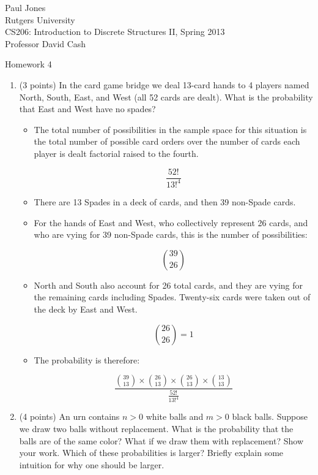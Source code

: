 \documentclass[11pt]{article}
\begin{document}
\noindent Paul Jones \\
Rutgers University\\
CS206: Introduction to Discrete Structures II, Spring 2013\\
Professor David Cash\\

\begin{center}
Homework 4
\end{center}

\begin{enumerate}

	\item (3 points) In the card game bridge we deal 13-card hands to 4 players
		  named North, South, East, and West (all 52 cards are dealt).  What is the
		  probability that East and West have no spades?
	
	\begin{itemize}
	
		\item The total number of possibilities in the sample space for this situation is
			  the total number of possible card orders over the number of cards each player
			  is dealt factorial raised to the fourth.
		
			  \[ \frac{52!}{13!^4} \]
		
		\item There are 13 Spades in a deck of cards, and then 39 non-Spade cards.
		\item For the hands of East and West, who collectively represent 26 cards,
			  and who are vying for 39 non-Spade cards, this is the number of 
			  possibilities:
		
			  \[ 39 \choose 26 \]
		
		\item North and South also account for 26 total cards, and they are vying
			  for the remaining cards including Spades. Twenty-six cards were taken
			  out of the deck by East and West.
			  
		     \[ {26 \choose 26} = 1 \]
		     
		\item The probability is therefore:
		
		     \[ \frac{{39 \choose 13}\times{26 \choose 13}\times{26 \choose 13}\times{13 \choose 13}}{\frac{52!}{13!^4}} \]
		     
	\end{itemize}
	
	\item (4 points) An urn contains $n>0$ white balls and $m>0$ black balls.
		  Suppose we draw two balls without replacement.  What is the probability that
		  the balls are of the same color?  What if we draw them with replacement?  Show
		  your work.  Which of these probabilities is larger?  Briefly explain some
		  intuition for why one should be larger.
		  

\end{enumerate}
\end{document}
